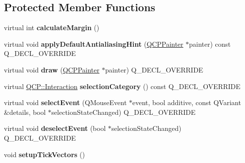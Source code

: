 \subsection*{Protected Member Functions}
\begin{DoxyCompactItemize}
\item 
virtual int {\bfseries calculate\+Margin} ()\hypertarget{class_q_c_p_axis_a47bdb0a55de6759489ee47665199aebb}{}\label{class_q_c_p_axis_a47bdb0a55de6759489ee47665199aebb}

\item 
virtual void {\bfseries apply\+Default\+Antialiasing\+Hint} (\hyperlink{class_q_c_p_painter}{Q\+C\+P\+Painter} $\ast$painter) const Q\+\_\+\+D\+E\+C\+L\+\_\+\+O\+V\+E\+R\+R\+I\+DE\hypertarget{class_q_c_p_axis_adbaeffcdc2707f2bd5dc1bbd11236770}{}\label{class_q_c_p_axis_adbaeffcdc2707f2bd5dc1bbd11236770}

\item 
virtual void {\bfseries draw} (\hyperlink{class_q_c_p_painter}{Q\+C\+P\+Painter} $\ast$painter) Q\+\_\+\+D\+E\+C\+L\+\_\+\+O\+V\+E\+R\+R\+I\+DE\hypertarget{class_q_c_p_axis_ac15ebb4225ca5212d8e5fffae481bc9b}{}\label{class_q_c_p_axis_ac15ebb4225ca5212d8e5fffae481bc9b}

\item 
virtual \hyperlink{namespace_q_c_p_a2ad6bb6281c7c2d593d4277b44c2b037}{Q\+C\+P\+::\+Interaction} {\bfseries selection\+Category} () const Q\+\_\+\+D\+E\+C\+L\+\_\+\+O\+V\+E\+R\+R\+I\+DE\hypertarget{class_q_c_p_axis_ab751e3e96495716a2f6742ca7d7b3d49}{}\label{class_q_c_p_axis_ab751e3e96495716a2f6742ca7d7b3d49}

\item 
virtual void {\bfseries select\+Event} (Q\+Mouse\+Event $\ast$event, bool additive, const Q\+Variant \&details, bool $\ast$selection\+State\+Changed) Q\+\_\+\+D\+E\+C\+L\+\_\+\+O\+V\+E\+R\+R\+I\+DE\hypertarget{class_q_c_p_axis_a50c3ed18e189d48421ec2978f88e4f87}{}\label{class_q_c_p_axis_a50c3ed18e189d48421ec2978f88e4f87}

\item 
virtual void {\bfseries deselect\+Event} (bool $\ast$selection\+State\+Changed) Q\+\_\+\+D\+E\+C\+L\+\_\+\+O\+V\+E\+R\+R\+I\+DE\hypertarget{class_q_c_p_axis_a5bc1f8a8d0fbc7658eba70c80279ed31}{}\label{class_q_c_p_axis_a5bc1f8a8d0fbc7658eba70c80279ed31}

\item 
void {\bfseries setup\+Tick\+Vectors} ()\hypertarget{class_q_c_p_axis_a57d9e961bae7d62f5b4e1f143e660c78}{}\label{class_q_c_p_axis_a57d9e961bae7d62f5b4e1f143e660c78}


\end{DoxyCompactItemize}
